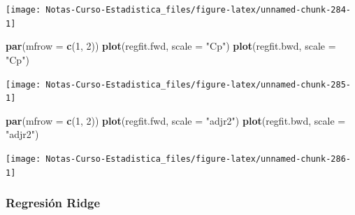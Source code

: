 \documentclass[
  12pt,
]{book}
\newenvironment{Shaded}{\begin{snugshade}}{\end{snugshade}}
\newcommand{\DataTypeTok}[1]{\textcolor[rgb]{0.13,0.29,0.53}{#1}}
\newcommand{\DecValTok}[1]{\textcolor[rgb]{0.00,0.00,0.81}{#1}}
\newcommand{\KeywordTok}[1]{\textcolor[rgb]{0.13,0.29,0.53}{\textbf{#1}}}
\newcommand{\NormalTok}[1]{#1}
\newcommand{\OperatorTok}[1]{\textcolor[rgb]{0.81,0.36,0.00}{\textbf{#1}}}
\newcommand{\StringTok}[1]{\textcolor[rgb]{0.31,0.60,0.02}{#1}}
\theoremstyle{definition}
\theoremstyle{definition}
\theoremstyle{definition}
\theoremstyle{remark}
\begin{document}
\begin{center}\texttt{[image: Notas-Curso-Estadistica\_files/figure-latex/unnamed-chunk-284-1]} \end{center}

\begin{Shaded}
\begin{Highlighting}[]
\KeywordTok{par}\NormalTok{(}\DataTypeTok{mfrow =} \KeywordTok{c}\NormalTok{(}\DecValTok{1}\NormalTok{, }\DecValTok{2}\NormalTok{))}
\KeywordTok{plot}\NormalTok{(regfit.fwd, }\DataTypeTok{scale =} \StringTok{"Cp"}\NormalTok{)}
\KeywordTok{plot}\NormalTok{(regfit.bwd, }\DataTypeTok{scale =} \StringTok{"Cp"}\NormalTok{)}
\end{Highlighting}
\end{Shaded}

\begin{center}\texttt{[image: Notas-Curso-Estadistica\_files/figure-latex/unnamed-chunk-285-1]} \end{center}

\begin{Shaded}
\begin{Highlighting}[]
\KeywordTok{par}\NormalTok{(}\DataTypeTok{mfrow =} \KeywordTok{c}\NormalTok{(}\DecValTok{1}\NormalTok{, }\DecValTok{2}\NormalTok{))}
\KeywordTok{plot}\NormalTok{(regfit.fwd, }\DataTypeTok{scale =} \StringTok{"adjr2"}\NormalTok{)}
\KeywordTok{plot}\NormalTok{(regfit.bwd, }\DataTypeTok{scale =} \StringTok{"adjr2"}\NormalTok{)}
\end{Highlighting}
\end{Shaded}

\begin{center}\texttt{[image: Notas-Curso-Estadistica\_files/figure-latex/unnamed-chunk-286-1]} \end{center}

\hypertarget{regresiuxf3n-ridge-1}{%
\subsubsection{Regresión Ridge}\label{regresiuxf3n-ridge-1}}

\begin{Shaded}
\end{Shaded}
\end{document}
